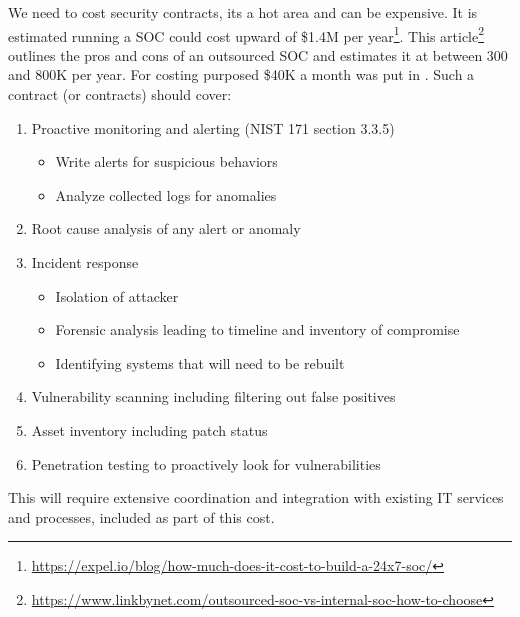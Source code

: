 



We need to cost security contracts, its a hot area and can be expensive.
It is estimated running a SOC could cost upward of \$1.4M per year\footnote{\url{https://expel.io/blog/how-much-does-it-cost-to-build-a-24x7-soc/}}.
This article\footnote{\url{https://www.linkbynet.com/outsourced-soc-vs-internal-soc-how-to-choose}} outlines the pros and cons of
an outsourced SOC and estimates it at between 300 and 800K per year.
For costing purposed  \$40K a month was put in .
Such a contract (or contracts) should cover:

\begin{enumerate}
\item Proactive monitoring and alerting (NIST 171 section 3.3.5)
  \begin{itemize}
  \item Write alerts for suspicious behaviors
  \item Analyze collected logs for anomalies
  \end{itemize}
\item Root cause analysis of any alert or anomaly
\item Incident response
  \begin{itemize}
  \item Isolation of attacker
  \item Forensic analysis leading to timeline and inventory of compromise
  \item Identifying systems that will need to be rebuilt
  \end{itemize}
\item Vulnerability scanning including filtering out false positives
\item Asset inventory including patch status
\item Penetration testing to proactively look for vulnerabilities
\end{enumerate}

This will require extensive coordination and integration with existing IT
services and processes, included as part of this cost.
